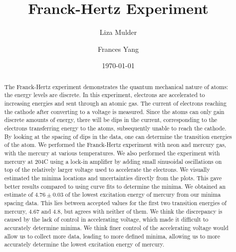 \documentclass[prb,preprint]{revtex4-1}
\begin{document}

\title{Franck-Hertz Experiment}


\author{Liza Mulder}


\author{Frances Yang}


\date{\today}



\begin{abstract}
The Franck-Hertz experiment demonstrates the quantum mechanical nature of atoms: the energy levels are discrete. 
In this experiment, electrons are accelerated to increasing energies and sent through an atomic gas. The current of electrons reaching the cathode after converting to a voltage is measured. 
Since the atoms can only gain discrete amounts of energy, there will be dips in the current, corresponding to the electrons transferring energy to the atoms, subsequently unable to reach the cathode.
By looking at the spacing of dips in the data, one can determine the transition energies of the atom. 
We performed the Franck-Hertz experiment with neon and mercury gas, with the mercury at various temperatures. 
We also performed the experiment with mercury at 204\degree C using a lock-in amplifier by adding small sinusoidal oscillations on top of the relatively larger voltage used to accelerate the electrons.
We visually estimated the minima locations and uncertainties directly from the plots. 
This gave better results compared to using curve fits to determine the minima.
We obtained an estimate of $4.76\pm 0.03$ of the lowest excitation energy of mercury from our minima spacing data.
This lies between accepted values for the first two transition energies of mercury,  $4.67$ and $4.8$, but agrees with neither of them.
We think the discrepancy is caused by the lack of control in accelerating voltage, which made it difficult to accurately determine minima.
We think finer control of the accelerating voltage would allow us to collect more data, leading to more defined minima, allowing us to more accurately determine the lowest excitation energy of mercury. 
\end{abstract}

\maketitle
\end{document}
